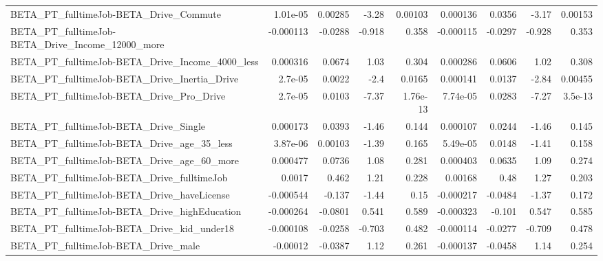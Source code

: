 \begin{tabular}{lrrrrrrrr}
BETA\_PT\_fulltimeJob-BETA\_Drive\_Commute             &    1.01e-05 &      0.00285 &    -3.28 &  0.00103 &   0.000136 &      0.0356 &        -3.17 &       0.00153 \\
BETA\_PT\_fulltimeJob-BETA\_Drive\_Income\_12000\_more   &   -0.000113 &      -0.0288 &   -0.918 &    0.358 &  -0.000115 &     -0.0297 &       -0.928 &         0.353 \\
BETA\_PT\_fulltimeJob-BETA\_Drive\_Income\_4000\_less    &    0.000316 &       0.0674 &     1.03 &    0.304 &   0.000286 &      0.0606 &         1.02 &         0.308 \\
BETA\_PT\_fulltimeJob-BETA\_Drive\_Inertia\_Drive       &     2.7e-05 &       0.0022 &     -2.4 &   0.0165 &   0.000141 &      0.0137 &        -2.84 &       0.00455 \\
BETA\_PT\_fulltimeJob-BETA\_Drive\_Pro\_Drive           &     2.7e-05 &       0.0103 &    -7.37 & 1.76e-13 &   7.74e-05 &      0.0283 &        -7.27 &       3.5e-13 \\
BETA\_PT\_fulltimeJob-BETA\_Drive\_Single              &    0.000173 &       0.0393 &    -1.46 &    0.144 &   0.000107 &      0.0244 &        -1.46 &         0.145 \\
BETA\_PT\_fulltimeJob-BETA\_Drive\_age\_35\_less         &    3.87e-06 &      0.00103 &    -1.39 &    0.165 &   5.49e-05 &      0.0148 &        -1.41 &         0.158 \\
BETA\_PT\_fulltimeJob-BETA\_Drive\_age\_60\_more         &    0.000477 &       0.0736 &     1.08 &    0.281 &   0.000403 &      0.0635 &         1.09 &         0.274 \\
BETA\_PT\_fulltimeJob-BETA\_Drive\_fulltimeJob         &      0.0017 &        0.462 &     1.21 &    0.228 &    0.00168 &        0.48 &         1.27 &         0.203 \\
BETA\_PT\_fulltimeJob-BETA\_Drive\_haveLicense         &   -0.000544 &       -0.137 &    -1.44 &     0.15 &  -0.000217 &     -0.0484 &        -1.37 &         0.172 \\
BETA\_PT\_fulltimeJob-BETA\_Drive\_highEducation       &   -0.000264 &      -0.0801 &    0.541 &    0.589 &  -0.000323 &      -0.101 &        0.547 &         0.585 \\
BETA\_PT\_fulltimeJob-BETA\_Drive\_kid\_under18         &   -0.000108 &      -0.0258 &   -0.703 &    0.482 &  -0.000114 &     -0.0277 &       -0.709 &         0.478 \\
BETA\_PT\_fulltimeJob-BETA\_Drive\_male                &    -0.00012 &      -0.0387 &     1.12 &    0.261 &  -0.000137 &     -0.0458 &         1.14 &         0.254 \\

\end{tabular}
